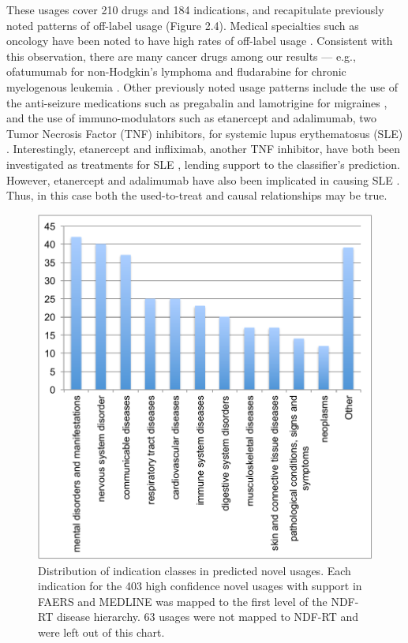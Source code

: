 These usages cover 210 drugs and 184 indications, and recapitulate
previously noted patterns of off-label usage (Figure 2.4).  Medical
specialties such as oncology have been noted to have high rates of
off-label usage \cite{Poole2004}. Consistent with this observation,
there are many cancer drugs among our results — e.g., ofatumumab for
non-Hodgkin’s lymphoma \cite{Hagenbeek2008} and fludarabine for
chronic myelogenous leukemia \cite{Or2003}.  Other previously noted
usage patterns include the use of the anti-seizure medications such as
pregabalin and lamotrigine for migraines
\cite{Lampl2005,Pizzolato2011}, and the use of immuno-modulators such
as etanercept and adalimumab, two Tumor Necrosis Factor (TNF)
inhibitors, for systemic lupus erythematosus (SLE)
\cite{Merrill2010,Merrill2010b}.  Interestingly, etanercept and
infliximab, another TNF inhibitor, have both been investigated as
treatments for SLE \cite{Hayat2007}, lending support to the
classifier’s prediction.  However, etanercept and adalimumab have also
been implicated in causing SLE \cite{Shakoor2002,Martin2011}.  Thus,
in this case both the used-to-treat and causal relationships may be
true.

\begin{figure}
  \begin{center}
    \includegraphics[width=0.9\linewidth]{ch2-figures/Figure3.pdf}
  \end{center}
  \caption[Distribution of indication classes in predicted novel
    usages]{Distribution of indication classes in predicted novel
    usages.  Each indication for the 403 high confidence novel usages
    with support in FAERS and MEDLINE was mapped to the first level of
    the NDF-RT disease hierarchy.  63 usages were not mapped to NDF-RT
    and were left out of this chart.  }
  \label{fig:short}
\end{figure}


